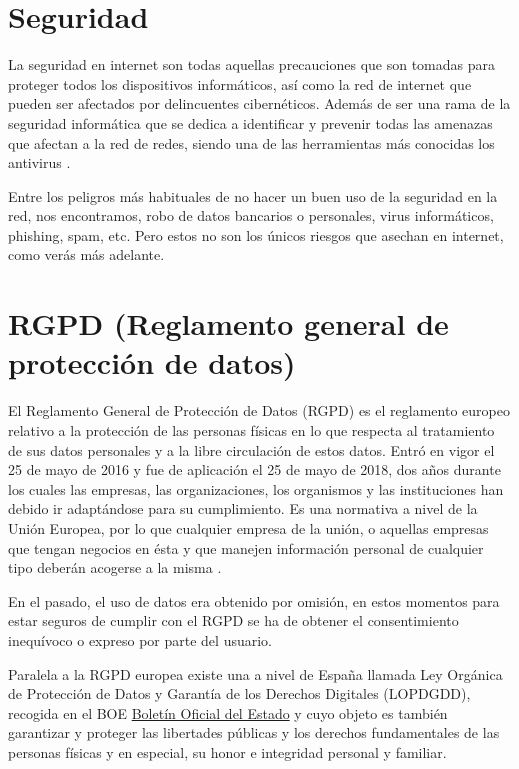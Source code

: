 \documentclass[
  a4paper,
  openany]{book}
\begin{document}
\hypertarget{seguridad}{%
\section{Seguridad}\label{seguridad}}

La seguridad en internet son todas aquellas precauciones que son tomadas para proteger todos los dispositivos informáticos, así como la red de internet que pueden ser afectados por delincuentes cibernéticos. Además de ser una rama de la seguridad informática que se dedica a identificar y prevenir todas las amenazas que afectan a la red de redes, siendo una de las herramientas más conocidas los antivirus \citep{seguridad}.

Entre los peligros más habituales de no hacer un buen uso de la seguridad en la red, nos encontramos, robo de datos bancarios o personales, virus informáticos, phishing, spam, etc. Pero estos no son los únicos riesgos que asechan en internet, como verás más adelante.

\hypertarget{rgpd-reglamento-general-de-protecciuxf3n-de-datos}{%
\section{RGPD (Reglamento general de protección de datos)}\label{rgpd-reglamento-general-de-protecciuxf3n-de-datos}}

El Reglamento General de Protección de Datos (RGPD) es el reglamento europeo relativo a la protección de las personas físicas en lo que respecta al tratamiento de sus datos personales y a la libre circulación de estos datos. Entró en vigor el 25 de mayo de 2016 y fue de aplicación el 25 de mayo de 2018, dos años durante los cuales las empresas, las organizaciones, los organismos y las instituciones han debido ir adaptándose para su cumplimiento. Es una normativa a nivel de la Unión Europea, por lo que cualquier empresa de la unión, o aquellas empresas que tengan negocios en ésta y que manejen información personal de cualquier tipo deberán acogerse a la misma \citep{WIKI-rgpd}.

En el pasado, el uso de datos era obtenido por omisión, en estos momentos para estar seguros de cumplir con el RGPD se ha de obtener el consentimiento inequívoco o expreso por parte del usuario.

Paralela a la RGPD europea existe una a nivel de España llamada Ley Orgánica de Protección de Datos y Garantía de los Derechos Digitales (LOPDGDD), recogida en el BOE \href{https://www.boe.es/buscar/doc.php?id=BOE-A-2018-16673}{Boletín Oficial del Estado} y cuyo objeto es también garantizar y proteger las libertades públicas y los derechos fundamentales de las personas físicas y en especial, su honor e integridad personal y familiar.
\end{document}
